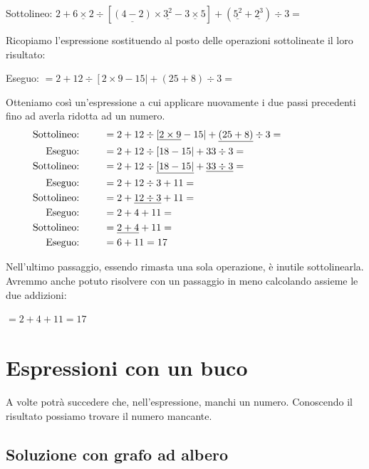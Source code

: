 \noindent Sottolineo: \hspace{28mm} \(2 + 
 \underline{6 \times 2} \div \left[ \underline{\left(4 -2 \right)} 
   \times \underline{3^{2}} - 
   \underline{3 \times 5} \right] +
 \left( \underline{5^{2}} + \underline{2^{3}} \right) \div 3 =\)

Ricopiamo l'espressione sostituendo al posto delle operazioni 
sottolineate il loro risultato:

\noindent Eseguo: \hspace{28.7mm} \(= 2 + 
 12 \div \left[ 2 \times 9 - 15 \right| +
 \left( 25 + 8 \right) \div 3 =\)

Otteniamo così un'espressione a cui applicare nuovamente i due passi 
precedenti fino ad averla ridotta ad un numero.
\begin{align*}
\text{Sottolineo: } \qquad &= 2 + 
 12 \div \left[ \underline{2 \times 9} - 15 \right| +
 \underline{\left( 25 + 8 \right)} \div 3 = \hspace{20mm}\\ 
\text{Eseguo: } \qquad &= 2 + 12 \div \left[ 18 - 15 \right| +
 33 \div 3 =\\ 
\text{Sottolineo: } \qquad &= 2 + 
 12 \div \underline{\left[ 18 - 15 \right|} +
 \underline{33 \div 3} = \\ 
\text{Eseguo: } \qquad &= 2 + 
 12 \div 3 +
 11 = \\ 
\text{Sottolineo: } \qquad &= 2 + 
 \underline{12 \div 3} +
 11 = \\ 
\text{Eseguo: } \qquad &= 2 + 
 4 +
 11 = \\ 
\text{Sottolineo: } \qquad &= \underline{2 +  4} + 11 = \\ 
\text{Eseguo: } \qquad &= 6 + 11 = 17
\end{align*}

Nell'ultimo passaggio, essendo rimasta una sola operazione, è inutile 
sottolinearla. Avremmo anche potuto risolvere con un passaggio in meno
calcolando assieme le due addizioni:

\(= 2 + 4 + 11 = 17\)

\section{Espressioni con un buco}
\label{sec:nat_espressioni_buco}

A volte potrà succedere che, nell'espressione, manchi un numero.
Conoscendo il risultato possiamo trovare il numero mancante.

\subsection{Soluzione con grafo ad albero}

